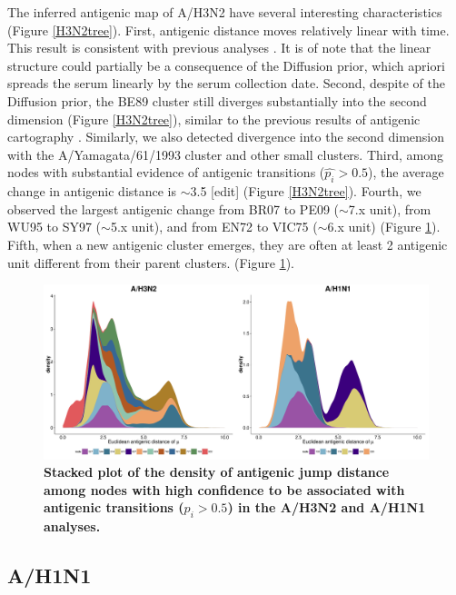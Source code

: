 \documentclass[11pt,oneside,letterpaper]{article}
\begin{document}
The inferred antigenic map of A/H3N2 have several interesting characteristics (Figure \ref{H3N2tree}). 
First, antigenic distance moves relatively linear with time.  
This result is consistent with previous analyses \cite{smith_mapping_2004, bedford_integrating_2014}.
It is of note that the linear structure could partially be a consequence of the Diffusion prior, which apriori spreads the serum linearly by the serum collection date. 
Second, despite of the Diffusion prior, the BE89 cluster still diverges substantially into the second dimension (Figure \ref{H3N2tree}), similar to the previous results of antigenic cartography \cite{smith_mapping_2004, bedford_integrating_2014}. 
Similarly, we also detected divergence into the second dimension with the A/Yamagata/61/1993 cluster and other small clusters. 
Third, among nodes with substantial evidence of antigenic transitions ($\hat{p_i} > 0.5$), the average change in antigenic distance is $\sim$3.5 [edit] (Figure \ref{H3N2tree}). 
Fourth, we observed the largest antigenic change from BR07 to PE09 ($\sim$7.x unit), from WU95 to SY97 ($\sim$5.x unit), and from EN72 to VIC75 ($\sim$6.x unit) (Figure \ref{stackedMuPlot}).
Fifth, when a new antigenic cluster emerges, they are often at least 2 antigenic unit different  from their parent clusters.  (Figure \ref{stackedMuPlot}). 


\begin{figure}[h]
	\centering		
	\includegraphics[width=1\textwidth]{figures/custom/stackedMuPlot}
	\caption{\textbf{Stacked plot of the density of antigenic jump distance among nodes with high confidence to be associated with antigenic transitions ($p_i > 0.5$)  in the A/H3N2 and A/H1N1 analyses.}
	} 
	\label{stackedMuPlot} 
\end{figure}

\subsection*{A/H1N1}
\end{document}
